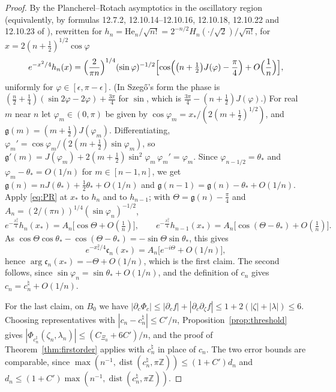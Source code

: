 \documentclass[11pt]{amsart}
\theoremstyle{definition}
\theoremstyle{remark}
\numberwithin{equation}{section}
\newcommand{\Z}{\mathbb{Z}}
\newcommand{\He}{\mathrm{He}}
\DeclareMathOperator{\dist}{dist}
\begin{document}
\begin{proof}
By the Plancherel--Rotach asymptotics in the oscillatory region \cite[Theorem~8.22.9(a), (8.22.12)]{Sz} (equivalently, by
formulas 12.7.2, 12.10.14--12.10.16, 12.10.18, 12.10.22 and 12.10.23 of \cite{DLMF}), rewritten for
$h_n=\He_n/\sqrt{n!}=2^{-n/2}H_n(\cdot/\sqrt2)/\sqrt{n!}$, for $x=2(n+\frac12)^{1/2}\cos\varphi$
\begin{equation}\label{eq:PR}
e^{-x^2/4}h_n(x)=\Bigl(\frac2{\pi n}\Bigr)^{1/4}(\sin\varphi)^{-1/2}\Bigl[\cos\Bigl(\bigl(n+\tfrac12\bigr)J(\varphi)-\frac\pi4\Bigr)
+O\Bigl(\frac1n\Bigr)\Bigr],
\end{equation}
uniformly for $\varphi\in[\epsilon,\pi-\epsilon]$. (In Szeg\H{o}'s form the phase is
$(\frac n2+\frac14)(\sin2\varphi-2\varphi)+\frac{3\pi}4$ for $\sin$, which is $\frac{3\pi}4-(n+\frac12)J(\varphi)$.) For real
$m$ near $n$ let $\varphi_m\in(0,\pi)$ be given by $\cos\varphi_m=x_*/(2(m+\frac12)^{1/2})$, and $\mathfrak g(m)=(m+\frac12)J(\varphi_m)$.
Differentiating, $\varphi_m'=\cos\varphi_m/(2(m+\frac12)\sin\varphi_m)$, so
$\mathfrak g'(m)=J(\varphi_m)+2(m+\frac12)\sin^2\varphi_m\,\varphi_m'=\varphi_m$. Since $\varphi_{n-1/2}=\theta_*$ and
$\varphi_m-\theta_*=O(1/n)$ for $m\in[n-1,n]$, we get $\mathfrak g(n)=nJ(\theta_*)+\frac12\theta_*+O(1/n)$ and
$\mathfrak g(n-1)=\mathfrak g(n)-\theta_*+O(1/n)$. Apply \eqref{eq:PR} at $x_*$ to $h_n$ and to $h_{n-1}$; with $\Theta=\mathfrak g(n)-\frac\pi4$ and
$A_n=(2/(\pi n))^{1/4}(\sin\varphi_n)^{-1/2}$,
\[
e^{-\frac{x_*^2}4}h_n(x_*)=A_n\bigl[\cos\Theta+O(\tfrac1n)\bigr],\qquad
e^{-\frac{x_*^2}4}h_{n-1}(x_*)=A_n\bigl[\cos(\Theta-\theta_*)+O(\tfrac1n)\bigr].
\]
As $\cos\Theta\cos\theta_*-\cos(\Theta-\theta_*)=-\sin\Theta\sin\theta_*$, this gives
\[
e^{-x_*^2/4}\mathfrak c_n(x_*)=A_n\bigl[e^{-i\Theta}+O(1/n)\bigr],
\]
hence $\arg\mathfrak c_n(x_*)=-\Theta+O(1/n)$, which is the first claim. The second follows, since
$\sin\varphi_n=\sin\theta_*+O(1/n)$, and the definition of $c_n$ gives $c_n=c_n^\natural+O(1/n)$.

For the last claim, on $B_0$ we have
$|\partial_c\Phi_c|\le|\partial_cf|+|\partial_c\partial_\zeta f|\le1+2(|\zeta|+|\lambda|)\le6$.
Choosing representatives with $|c_n-c_n^\natural|\le C'/n$, Proposition~\ref{prop:threshold} gives
$|\Phi_{c_n^\natural}(\zeta_n,\lambda_n)|\le(C_{\Xi_0}+6C')/n$, and the proof of Theorem~\ref{thm:firstorder} applies with
$c_n^\natural$ in place of $c_n$. The two error bounds are comparable, since
$\max(n^{-1},\dist(c_n^\natural,\pi\Z))\le(1+C')d_n$ and $d_n\le(1+C')\max(n^{-1},\dist(c_n^\natural,\pi\Z))$.
\end{proof}
\end{document}
